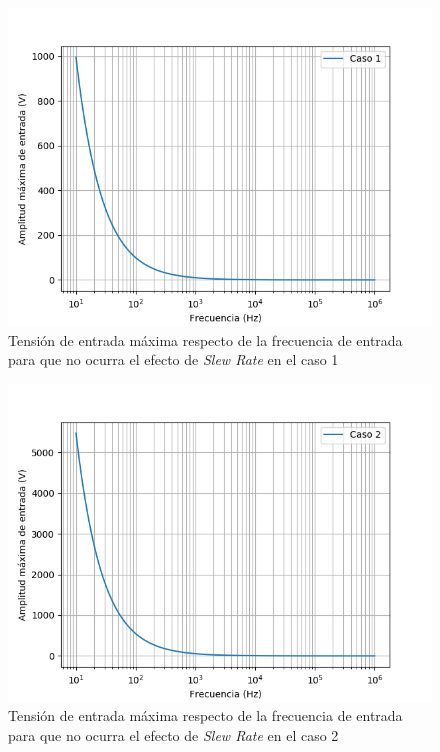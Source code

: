 \begin{figure}[H]
\begin{centering}
\includegraphics[scale=0.5]{../Ex1/ib/Resources1b/slewRate1}
\par\end{centering}
\centering{}\caption{Tensión de entrada máxima respecto de la frecuencia de entrada para
que no ocurra el efecto de \emph{Slew Rate} en el caso 1}
\label{1_b_23}
\end{figure}

\begin{figure}[H]
\begin{centering}
\includegraphics[scale=0.5]{../Ex1/ib/Resources1b/slewRate2}
\par\end{centering}
\centering{}\caption{Tensión de entrada máxima respecto de la frecuencia de entrada para
que no ocurra el efecto de \emph{Slew Rate} en el caso 2}
\label{1_b_24}
\end{figure}

